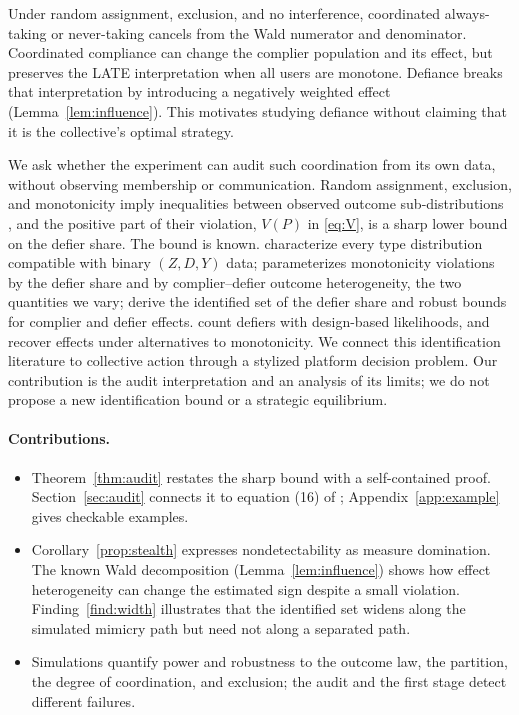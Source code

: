 \documentclass{article}
\theoremstyle{remark}
\begin{document}
Under random assignment, exclusion, and no interference, coordinated
always-taking or never-taking cancels from the Wald numerator and denominator.
Coordinated compliance can change the complier population and its effect, but
preserves the LATE interpretation when all users are monotone. Defiance breaks
that interpretation by introducing a negatively weighted effect
(Lemma~\ref{lem:influence}). This motivates studying defiance without claiming
that it is the collective's optimal strategy.

We ask whether the experiment can audit such coordination from its own data,
without observing membership or communication. Random assignment, exclusion,
and monotonicity imply inequalities between observed outcome sub-distributions
\citep{balke1997,kitagawa2015,mourifie2017}, and the positive part of their
violation, $V(P)$ in \eqref{eq:V}, is a sharp lower bound on the defier share.
The bound is known. \citet{richardson2010binary} characterize every type
distribution compatible with binary $(Z,D,Y)$ data;
\citet{noack2021sensitivity} parameterizes monotonicity violations by the
defier share and by complier--defier outcome heterogeneity, the two quantities
we vary; \citet{kedagni2024robust} derive the identified set of the defier
share and robust bounds for complier and defier effects.
\citet{kowalski2019counting,christy2024counting} count defiers with
design-based likelihoods, and \citet{dechaisemartin2017,dahl2023} recover
effects under alternatives to monotonicity. We connect this identification
literature to collective action through a stylized platform decision problem.
Our contribution is the audit interpretation and an analysis of its limits;
we do not propose a new identification bound or a strategic equilibrium.

\paragraph{Contributions.}
\begin{itemize}[leftmargin=1.2em,itemsep=1pt,topsep=1pt]
\item Theorem~\ref{thm:audit} restates the sharp bound with a self-contained
proof. Section~\ref{sec:audit} connects it to equation (16) of
\citet{richardson2010binary}; Appendix~\ref{app:example} gives checkable examples.
\item Corollary~\ref{prop:stealth} expresses nondetectability as measure
domination. The known Wald decomposition (Lemma~\ref{lem:influence}) shows how
effect heterogeneity can change the estimated sign despite a small violation.
Finding~\ref{find:width} illustrates that the identified set widens along the
simulated mimicry path but need not along a separated path.
\item Simulations quantify power and robustness to the outcome law, the
partition, the degree of coordination, and exclusion; the audit and the first
stage detect different failures.
\end{itemize}
\end{document}
